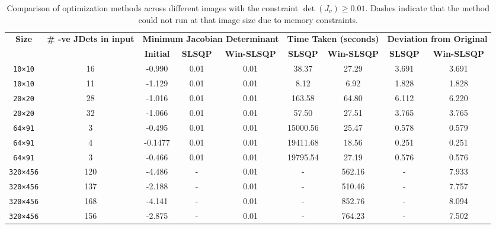 \documentclass[lettersize,journal]{IEEEtran}
\begin{document}
\begin{table}[ht]
\centering
\caption{Comparison of optimization methods across different images with the constraint $\det(J_v)\geq 0.01$. Dashes indicate that the method could not run at that image size due to memory constraints.}
\label{tab:jac_results}
\renewcommand{\arraystretch}{1.2}
\begin{tabular}{|c|c|ccc|cc|cc|}
\hline
\textbf{Size} &
\textbf{\# -ve JDets in input} &
\multicolumn{3}{c|}{\textbf{Minimum Jacobian Determinant}} &
\multicolumn{2}{c|}{\textbf{Time Taken (seconds)}} &
\multicolumn{2}{c|}{\textbf{Deviation from Original}} \\
\cline{3-9}
 &  & \textbf{Initial} &
\textbf{SLSQP} & \textbf{Win-SLSQP} &
\textbf{SLSQP} & \textbf{Win-SLSQP} &
\textbf{SLSQP} & \textbf{Win-SLSQP} \\
\hline


\texttt{10×10} & 16 & -0.990 & 0.01 & 0.01 & 38.37 & 27.29 & 3.691 & 3.691 \\   %
\texttt{10×10} & 11 & -1.129 & 0.01 & 0.01 & 8.12 & 6.92   & 1.828 & 1.828 \\   %
\texttt{20×20} & 28 & -1.016 & 0.01 & 0.01 & 163.58 & 64.80 & 6.112 & 6.220 \\  %
\texttt{20×20} & 32 & -1.066 & 0.01 & 0.01 & 57.50 & 27.51 & 3.765 & 3.765 \\      %
\texttt{64×91} & 3 & -0.495 & 0.01 & 0.01 & 15000.56 & 25.47 & 0.578 & 0.579 \\  %
\texttt{64×91} & 4 & -0.1477 & 0.01 &0.01 & 19411.68 & 18.56 & 0.251 & 0.251 \\  %
\texttt{64×91} & 3 & -0.466 & 0.01 & 0.01 & 19795.54 & 27.19 & 0.576 & 0.576 \\ %
\texttt{320×456} & 120 & -4.486 & -  & 0.01 & - & 562.16 & - & 7.933  \\  %
\texttt{320×456} & 137 & -2.188 & - & 0.01 & - & 510.46 & - & 7.757  \\  %
\texttt{320×456} & 168 & -4.141 & -  & 0.01 & - & 852.76 & - & 8.094  \\  %
\texttt{320×456} & 156 & -2.875 & - & 0.01 & - &  764.23 & - & 7.502  \\  %

\hline
\end{tabular}
\end{table}
\end{document}

